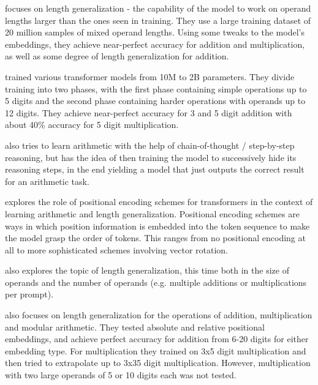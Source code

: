 \cite{rightembeddings} focuses on length generalization - the capability of the model to work on operand lengths larger than the ones seen in training. They use a large training dataset of 20 million samples of mixed operand lengths. Using some tweaks to the model's embeddings, they achieve near-perfect accuracy for addition and multiplication, as well as some degree of length generalization for addition.

\cite{nocalculator} trained various transformer models from 10M to 2B parameters. They divide training into two phases, with the first phase containing simple operations up to 5 digits and the second phase containing harder operations with operands up to 12 digits. They achieve near-perfect accuracy for 3 and 5 digit addition with about 40\% accuracy for 5 digit multiplication.

\cite{implicit} also tries to learn arithmetic with the help of chain-of-thought / step-by-step reasoning, but has the idea of then training the model to successively hide its reasoning steps, in the end yielding a model that just outputs the correct result for an arithmetic task. 

\cite{positionmatters} explores the role of positional encoding schemes for transformers in the context of learning arithmetic and length generalization. Positional encoding schemes are ways in which position information is embedded into the token sequence to make the model grasp the order of tokens. This ranges from no positional encoding at all to more sophisticated schemes involving vector rotation.

\cite{lengthandcount} also explores the topic of length generalization, this time both in the size of operands and the number of operands (e.g. multiple additions or multiplications per prompt).

\cite{lengthgen} also focuses on length generalization for the operations of addition, multiplication and modular arithmetic. They tested absolute and relative positional embeddings, and achieve perfect accuracy for addition from 6-20 digits for either embedding type. For multiplication they trained on 3x5 digit multiplication and then tried to extrapolate up to 3x35 digit multiplication. However, multiplication with two large operands of 5 or 10 digits each was not tested.